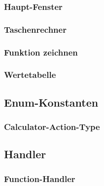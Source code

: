 \documentclass[12pt,a4paper]{article}
\newcommand{\project}{/home/jonas/Dokumente/Java-Projekte/GraphingCalculator/src/main/java/de/jonas/graphingcalculator}
\begin{document}
    \subsubsection{Haupt-Fenster}
    

    \newpage

    \subsubsection{Taschenrechner}
    

    \newpage

    \subsubsection{Funktion zeichnen}
    

    \newpage

    \subsubsection{Wertetabelle}
    

    \newpage

    \subsection{Enum-Konstanten}

    \subsubsection{Calculator-Action-Type}
    

    \newpage

    \subsection{Handler}

    \subsubsection{Function-Handler}
    
\end{document}
